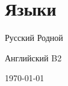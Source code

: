 \documentclass{cv}
\begin{document}
\section{Языки}

\begin{cvblock}{Русский}
	Родной
\end{cvblock}

\begin{cvblock}{Английский}
	B2
\end{cvblock}

\vfill

\begin{center}
	\monthyear\today
\end{center}
\end{document}
